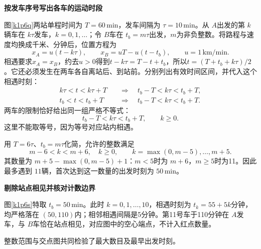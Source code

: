 \begin{solution}\textbf{按发车序号写出各车的运动时段}\par\nobreak
图\ref{k1p6q}两站单程时间为 $T=60\,\mathrm{min}$，发车间隔为 $\tau=10\,\mathrm{min}$。从 $A$出发的第 $k$辆车在 $k\tau$发车，$k=0,1,\ldots$；令 $B$车在 $t_b=m\tau$出发，$m$为非负整数。将路程与速度均换成千米、分钟后，位置方程为
\[x_A=u(t-k\tau),\qquad x_B=uT-u(t-t_b),
\qquad u=1\,\mathrm{km/min}.\]
相遇要求$x_A=x_B$，约去$u>0$得到$t-k\tau=T-t+t_b$，所以$t=(T+t_b+k\tau)/2$。它还必须发生在两车各自离站后、到站前。分别列出有效时间区间，并代入这个相遇时刻：
\begin{align*}
k\tau<t<k\tau+T
&\quad\Longrightarrow\quad t_b-T<k\tau<t_b+T,\\
t_b<t<t_b+T
&\quad\Longrightarrow\quad t_b-T<k\tau<t_b+T.
\end{align*}
两车的限制恰好给出同一组严格不等式：
\[t_b-T<k\tau<t_b+T,\qquad k\ge0.\]
这里不能取等号，因为等号对应站内相遇。

用 $T=6\tau$、$t_b=m\tau$化简，允许的整数满足
\[m-6<k<m+6,\quad k\ge0,
\qquad k=\max(0,m-5),\ldots,m+5.\]
其数量为 $m+5-\max(0,m-5)+1$：$m<5$时为 $m+6$，$m\ge5$时为11。因此最多遇到 $\boxed{11\text{辆}}$，首次达到这一数量的出发时刻为 $\boxed{50\,\mathrm{min}}$。



\par\medskip{}\noindent\textbf{剔除站点相见并核对计数边界}\par\nobreak
图\ref{k1p6s}特取 $t_b=50\,\mathrm{min}$。此时 $k=0,1,\ldots,10$，相遇时刻为 $t_k=55+5k$分钟，均严格落在 $(50,110)$内；相邻相遇间隔是5分钟。第11号车于110分钟在 $A$发车，与 $B$车恰在站点相见，对应图中的空心端点，不计入红点数量。

整数范围与交点图共同检验了最大数目及最早出发时刻。
\end{solution}

